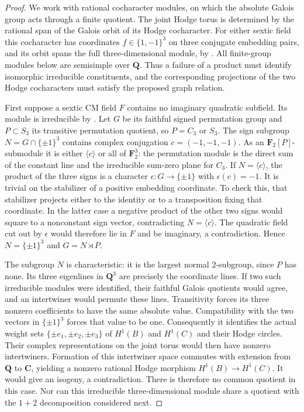 \documentclass[10pt,reqno]{article}
\theoremstyle{emphasizedplain}
\theoremstyle{emphasizeddefinition}
\theoremstyle{emphasizeddefinition}
\newcommand{\Q}{\mathbf Q}
\newcommand{\C}{\mathbf C}
\begin{document}
\begin{proof}
We work with rational cocharacter modules, on which the absolute Galois
group acts through a finite quotient. The joint Hodge torus is determined
by the rational span of the Galois orbit of its Hodge cocharacter.
For either sextic field this cocharacter has coordinates
$f\in\{1,-1\}^3$ on three conjugate embedding pairs, and its orbit spans
the full three-dimensional module, by \cite[\S2.3]{MZ}.
All finite-group modules below are semisimple over $\Q$.
Thus a failure of a product must identify isomorphic irreducible
constituents, and the corresponding projections of the two Hodge
cocharacters must satisfy the proposed graph relation.

First suppose a sextic CM field $F$ contains no imaginary quadratic
subfield. Its module is irreducible by \cite[Proposition (2.4)]{MZ}.
Let $G$ be its faithful signed permutation group and $P\subset S_3$
its transitive permutation quotient, so $P=C_3$ or $S_3$.
The sign subgroup $N=G\cap\{\pm1\}^3$ contains complex conjugation
$c=(-1,-1,-1)$. As an $\mathbf F_2[P]$-submodule it is either
$\langle c\rangle$ or all of $\mathbf F_2^3$: the permutation module
is the direct sum of the constant line and the irreducible
sum-zero plane for $C_3$.
If $N=\langle c\rangle$, the product of the three signs is a
character $\epsilon:G\to\{\pm1\}$ with $\epsilon(c)=-1$.
It is trivial on the stabilizer of a positive embedding coordinate.
To check this, that stabilizer projects either to the identity or to
a transposition fixing that coordinate. In the latter case a negative
product of the other two signs would square to a nonconstant sign
vector, contradicting $N=\langle c\rangle$.
The quadratic field cut out by $\epsilon$ would therefore lie in $F$
and be imaginary, a contradiction. Hence $N=\{\pm1\}^3$ and
$G=N\rtimes P$.

The subgroup $N$ is characteristic: it is the largest normal
$2$-subgroup, since $P$ has none. Its three eigenlines in $\Q^3$ are
precisely the coordinate lines. If two such irreducible modules were
identified, their faithful Galois quotients would agree, and an
intertwiner would permute these lines. Transitivity forces its three
nonzero coefficients to have the same absolute value. Compatibility
with the two vectors in $\{\pm1\}^3$ forces that value to be one.
Consequently it identifies the actual weight sets $\{\pm e_1,\pm
 e_2,\pm e_3\}$ of $H^1(B)$ and $H^1(C)$ and their Hodge circles.
Their complex representations on the joint torus would then have
nonzero intertwiners. Formation of this intertwiner space commutes with
extension from $\Q$ to $\C$, yielding a nonzero rational Hodge morphism
$H^1(B)\to H^1(C)$. It would give an isogeny, a contradiction.
There is therefore no common quotient in this case. Nor can this
irreducible three-dimensional module share a quotient with the
$1+2$ decomposition considered next.


\end{proof}
\end{document}
